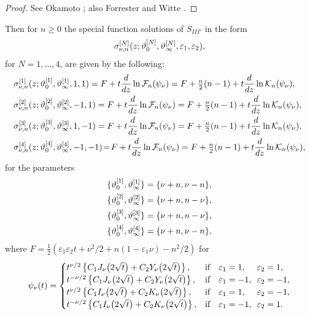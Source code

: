\documentclass[12pt]{article}
\def\F{\mathcal{F}}
\def\K{\mathcal{K}}
\numberwithin{figure}{section}
\numberwithin{equation}{section}
\numberwithin{table}{section}
\begin{document}
\begin{proof}
See Okamoto \cite{P:275:221}; also Forrester and Witte \cite{P:219:357}.
\end{proof}
Then for $n\geq0$ the special function solutions of $S_{III'}$ in the form $$\sigma^{[N]}_{\nu,n}(z;\vartheta_0^{[N]},\vartheta_\infty^{[N]},\varepsilon_1,\varepsilon_2),$$ for $N=1,...,4$, are given by the following:
\begin{subequations}
\begin{align*}
&\sigma^{[1]}_{\nu,n}(z;\th_0^{[1]},\th_\infty^{[1]},1,1)=F+t\frac{d}{dz}\ln\F_{n}(\psi_\nu)=
F+\tfrac{n}{2}(n-1)+t\frac{d}{dz}\ln\K_{n}(\psi_\nu),\\
&\sigma^{[2]}_{\nu,n}(z;\th_0^{[2]},\th_\infty^{[2]},-1,1)=F+t\frac{d}{dz}\ln\F_{n}(\psi_\nu)=
F+\tfrac{n}{2}(n-1)+t\frac{d}{dz}\ln\K_{n}(\psi_\nu),\\
&\sigma^{[3]}_{\nu,n}(z;\th_0^{[3]},\th_\infty^{[3]},1,-1)=F+t\frac{d}{dz}\ln\F_{n}(\psi_\nu)=
F+\tfrac{n}{2}(n-1)+t\frac{d}{dz}\ln\K_{n}(\psi_\nu),\\
&\sigma^{[4]}_{\nu,n}(z;\th_0^{[4]},\th_\infty^{[4]},-1,-1)\!=\!F+t\frac{d}{dz}\ln\F_{n}(\psi_\nu)=
F+\tfrac{n}{2}(n-1)+t\frac{d}{dz}\ln\K_{n}(\psi_\nu),\\
\end{align*}
\end{subequations}
for the parameters
\begin{subequations}
\begin{align*}
\{\vartheta_0^{[1]},\vartheta_\infty^{[1]}\}&=\{\nu+n,\nu-n\},\\
\{\vartheta_0^{[2]},\vartheta_\infty^{[2]}\}&=\{\nu+n,n-\nu\},\\
\{\vartheta_0^{[3]},\vartheta_\infty^{[3]}\}&=\{\nu+n,n-\nu\},\\
\{\vartheta_0^{[4]},\vartheta_\infty^{[4]}\}&=\{\nu+n,\nu-n\},
\end{align*}
\end{subequations}
where $F=\tfrac{1}{2}(\varepsilon_1\varepsilon_2t+\nu^2/2+n(1-\varepsilon_1\nu)-n^2/2)$
for
$$\psi_{\nu}(t)=\begin{cases}
t^{\nu/2}\left\{C_1J_{\nu}\big(2\sqrt t\big)+C_2Y_{\nu}\big(2\sqrt t\big)\right\},&\mbox{\rm if}\quad \varepsilon_1=1,\phantom{-}\enskip\varepsilon_2=1,\\
t^{-\nu/2}\left\{C_1J_{\nu}\big(2\sqrt t\big)+C_2Y_{\nu}\big(2\sqrt t\big)\right\},&\mbox{\rm if}\quad \varepsilon_1=-1,\enskip\varepsilon_2=-1,\\
t^{\nu/2}\left\{C_1I_{\nu}\big(2\sqrt t\big)+C_2K_{\nu}\big(2\sqrt t\big)\right\},&\mbox{\rm if}\quad\varepsilon_1=1,\phantom{-}\enskip\varepsilon_2=-1,\\
t^{-\nu/2}\left\{C_1I_{\nu}\big(2\sqrt t\big)+C_2K_{\nu}\big(2\sqrt t\big)\right\},&\mbox{\rm if}\quad\varepsilon_1=-1,\enskip\varepsilon_2=1.
\end{cases}
$$
\end{document}
